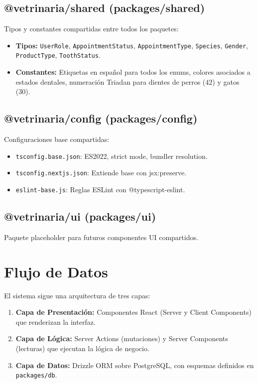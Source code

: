\subsection{@vetrinaria/shared (packages/shared)}

Tipos y constantes compartidas entre todos los paquetes:

\begin{itemize}[leftmargin=*]
    \item \textbf{Tipos:} \texttt{UserRole}, \texttt{AppointmentStatus},
          \texttt{AppointmentType}, \texttt{Species}, \texttt{Gender},
          \texttt{ProductType}, \texttt{ToothStatus}.
    \item \textbf{Constantes:} Etiquetas en espa\~nol para todos los enums,
          colores asociados a estados dentales, numeraci\'on Triadan para
          dientes de perros (42) y gatos (30).
\end{itemize}

\subsection{@vetrinaria/config (packages/config)}

Configuraciones base compartidas:

\begin{itemize}[leftmargin=*]
    \item \texttt{tsconfig.base.json}: ES2022, strict mode, bundler resolution.
    \item \texttt{tsconfig.nextjs.json}: Extiende base con jsx:preserve.
    \item \texttt{eslint-base.js}: Reglas ESLint con @typescript-eslint.
\end{itemize}

\subsection{@vetrinaria/ui (packages/ui)}

Paquete placeholder para futuros componentes UI compartidos.

\section{Flujo de Datos}

El sistema sigue una arquitectura de tres capas:

\begin{enumerate}[leftmargin=*]
    \item \textbf{Capa de Presentaci\'on:} Componentes React (Server y Client
          Components) que renderizan la interfaz.
    \item \textbf{Capa de L\'ogica:} Server Actions (mutaciones) y Server
          Components (lecturas) que ejecutan la l\'ogica de negocio.
    \item \textbf{Capa de Datos:} Drizzle ORM sobre PostgreSQL, con esquemas
          definidos en \texttt{packages/db}.
\end{enumerate}

